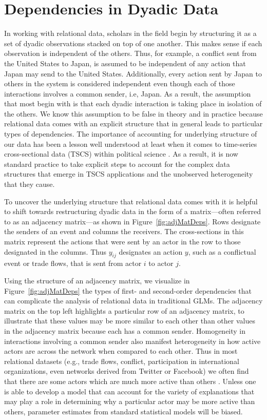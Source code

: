 \section{\textbf{Dependencies in Dyadic Data}}

In working with relational data, scholars in the field begin by structuring it as a set of dyadic observations stacked on top of one another. This makes sense if each observation is independent of the others. Thus, for example, a conflict sent from the United States to Japan, is assumed to be independent of any action that Japan may send to the United States. Additionally, every action sent by Japan to others in the system is considered independent even though each of those interactions involves a common sender, i.e, Japan. As a result, the assumption that most begin with is that each dyadic interaction is taking place in isolation of the others. We know this assumption to be false in theory and in practice because relational data comes with an explicit structure that in general leads to particular types of dependencies. The importance of accounting for underlying structure of our data has been a lesson well understood at least when it comes to time-series cross-sectional data (TSCS) within political science \citep{beck:katz:1995,beck:etal:1998}. As a result, it is now standard practice to take explicit steps to account for the complex data structures that emerge in TSCS applications and the unobserved heterogeneity that they cause.

To uncover the underlying structure that relational data comes with it is helpful to shift towards restructuring dyadic data in the form of a matrix---often referred to as an adjacency matrix---as shown in Figure~\ref{fig:adjMatDeps}. Rows designate the senders of an event and columns the receivers. The cross-sections in this matrix represent the actions that were sent by an actor in the row to those designated in the columns. Thus $y_{ij}$ designates an action $y$, such as a conflictual event or trade flows, that is sent from actor $i$ to actor $j$. 

Using the structure of an adjacency matrix, we visualize in Figure~\ref{fig:adjMatDeps} the types of first- and second-order dependencies that can complicate the analysis of relational data in traditional GLMs. The adjacency matrix on the top left highlights a particular row of an adjacency matrix, to illustrate that these values may be more similar to each other than other values in the adjacency matrix because each has a common sender. Homogeneity in interactions involving a common sender also manifest heterogeneity in how active actors are across the network when compared to each other. Thus in most relational datasets (e.g., trade flows, conflict, participation in international organizations, even networks derived from Twitter or Facebook) we often find that there are some actors which are much more active than others \citep{barabasi:reka:1999}. Unless one is able to develop a model that can account for the variety of explanations that may play a role in determining why a particular actor may be more active than others, parameter estimates from standard statistical models will be biased.

